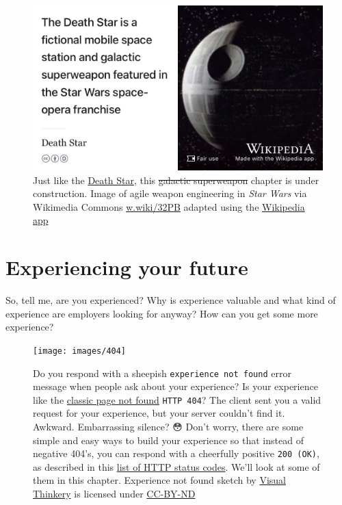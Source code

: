 \documentclass[
]{book}
\begin{document}
\begin{figure}

{\centering \includegraphics[width=0.99\linewidth]{images/DeathStar2} 

}

\caption{Just like the \href{https://en.wikipedia.org/wiki/Death_Star}{Death Star}, this \sout{galactic superweapon} chapter is under construction. Image of agile weapon engineering in \emph{Star Wars} via Wikimedia Commons \href{https://w.wiki/32PB}{w.wiki/32PB} adapted using the \href{https://apps.apple.com/gb/app/wikipedia/id324715238}{Wikipedia app}}\label{fig:deathstar-fig}
\end{figure}



\hypertarget{experiencing}{%
\chapter{Experiencing your future}\label{experiencing}}

So, tell me, are you experienced? Why is experience valuable and what kind of experience are employers looking for anyway? How can you get some more experience? 🤔

\begin{figure}

{\centering \texttt{[image: images/404]} 

}

\caption{Do you respond with a sheepish \texttt{experience\ not\ found} error message when people ask about your experience? Is your experience like the \href{https://en.wikipedia.org/wiki/HTTP_404}{classic page not found} \texttt{HTTP\ 404}? The client sent you a valid request for your experience, but your server couldn't find it. Awkward. Embarrassing silence? 😳 Don't worry, there are some simple and easy ways to build your experience so that instead of negative 404's, you can respond with a cheerfully positive \texttt{200\ (OK)}, as described in this \href{https://en.wikipedia.org/wiki/List_of_HTTP_status_codes}{list of HTTP status codes}. We'll look at some of them in this chapter. Experience not found sketch by \href{https://visualthinkery.com/}{Visual Thinkery} is licensed under \href{https://creativecommons.org/licenses/by-nd/4.0/}{CC-BY-ND}}\label{fig:404-fig}
\end{figure}
\end{document}

